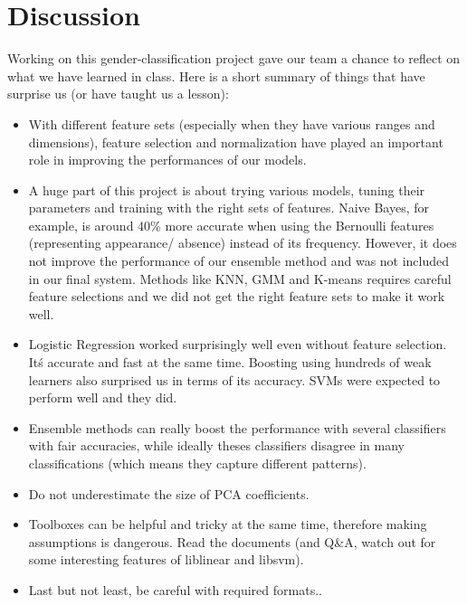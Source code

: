 \section{Discussion}
Working on this gender-classification project gave our team a chance to reflect on what we have learned in class. Here is a short summary of things that have surprise us (or have taught us a lesson):
\begin{itemize}
\item With different feature sets (especially when they have various ranges and dimensions), feature selection and normalization have played an important role in improving the performances of our models. 
\item A huge part of this project is about trying various models, tuning their parameters and training with the right sets of features. Naive Bayes, for example, is around 40\% more accurate when using the Bernoulli features (representing appearance/ absence) instead of its frequency. However, it does not improve the performance of our ensemble method and was not included in our final system. Methods like KNN, GMM and K-means requires careful feature selections and we did not get the right feature sets to make it work well. 
\item Logistic Regression worked surprisingly well even without feature selection. It\'s accurate and fast at the same time. Boosting using hundreds of weak learners also surprised us in terms of its accuracy. SVMs were expected to perform well and they did.
\item Ensemble methods can really boost the performance with several classifiers with fair accuracies, while ideally theses classifiers disagree in many classifications (which means they capture different patterns).
\item Do not underestimate the size of PCA coefficients. 
\item Toolboxes can be helpful and tricky at the same time, therefore making assumptions is dangerous. Read the documents (and Q\&A, watch out for some interesting features of liblinear and libsvm).
\item Last but not least, be careful with required formats..
\end{itemize} 
